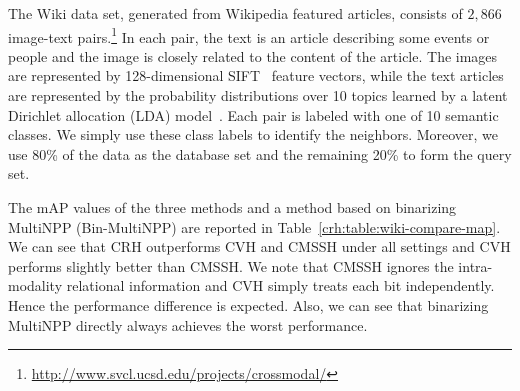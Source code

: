 The \mbox{Wiki} data set, generated from Wikipedia featured articles, consists of $2{,}866$ image-text pairs.\footnote{\url{http://www.svcl.ucsd.edu/projects/crossmodal/}} In each pair, the text is an article describing some events or people and the image is closely related to the content of the article. The images are represented by 128-dimensional \mbox{SIFT}~\cite{lowe2004ijcv} feature vectors, while the text articles are represented by the probability distributions over 10 topics learned by a latent Dirichlet allocation (\mbox{LDA}) model~\cite{blei2003jmlr}. Each pair is labeled with one of 10 semantic classes.  We simply use these class labels to identify the neighbors. Moreover, we use 80\% of the data as the database set and the remaining 20\% to form the query set.

The mAP values of the three methods and a method based on binarizing MultiNPP (Bin-MultiNPP) are reported in Table~\ref{crh:table:wiki-compare-map}.  We can see that \mbox{CRH} outperforms \mbox{CVH} and \mbox{CMSSH} under all settings and \mbox{CVH} performs slightly better than \mbox{CMSSH}.  We note that \mbox{CMSSH} ignores the intra-modality relational information and \mbox{CVH} simply treats each bit independently.  Hence the performance difference is expected. Also, we can see that binarizing MultiNPP directly always achieves the worst performance.

